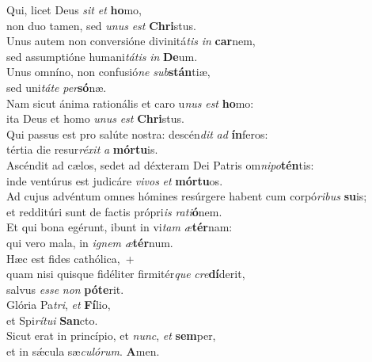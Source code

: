 \evenverse Qui, licet Deus \textit{sit} \textit{et} \textbf{ho}mo,~\*\\
\evenverse non duo tamen, sed \textit{u}\textit{nus} \textit{est} \textbf{Chri}stus.\\
\oddverse Unus autem non conversióne divinitá\textit{tis} \textit{in} \textbf{car}nem,~\*\\
\oddverse sed assumptióne humani\textit{tá}\textit{tis} \textit{in} \textbf{De}um.\\
\evenverse Unus omníno, non confusió\textit{ne} \textit{sub}\textbf{stán}tiæ,~\*\\
\evenverse sed uni\textit{tá}\textit{te} \textit{per}\textbf{só}næ.\\
\oddverse Nam sicut ánima rationális et caro u\textit{nus} \textit{est} \textbf{ho}mo:~\*\\
\oddverse ita Deus et homo \textit{u}\textit{nus} \textit{est} \textbf{Chri}stus.\\
\evenverse Qui passus est pro salúte nostra: descén\textit{dit} \textit{ad} \textbf{ín}feros:~\*\\
\evenverse tértia die resur\textit{ré}\textit{xit} \textit{a} \textbf{mór}\textbf{tu}is.\\
\oddverse Ascéndit ad cælos, sedet ad déxteram Dei Patris om\textit{ni}\textit{po}\textbf{tén}tis:~\*\\
\oddverse inde ventúrus est judicáre \textit{vi}\textit{vos} \textit{et} \textbf{mór}\textbf{tu}os.\\
\evenverse Ad cujus advéntum omnes hómines resúrgere habent cum corpó\textit{ri}\textit{bus} \textbf{su}is;~\*\\
\evenverse et redditúri sunt de factis própri\textit{is} \textit{ra}\textit{ti}\textbf{ó}nem.\\
\oddverse Et qui bona egérunt, ibunt in vi\textit{tam} \textit{æ}\textbf{tér}nam:~\*\\
\oddverse qui vero mala, in \textit{i}\textit{gnem} \textit{æ}\textbf{tér}num.\\
\evenverse Hæc est fides cathólica,~+\\
\evenverse  quam nisi quisque fidéliter firmitér\textit{que} \textit{cre}\textbf{dí}derit,~\*\\
\evenverse salvus \textit{es}\textit{se} \textit{non} \textbf{pó}\textbf{te}rit.\\
\oddverse Glória Pa\textit{tri}, \textit{et} \textbf{Fí}lio,~\*\\
\oddverse et Spi\textit{rí}\textit{tu}\textit{i} \textbf{San}cto.\\
\evenverse Sicut erat in princípio, et \textit{nunc}, \textit{et} \textbf{sem}per,~\*\\
\evenverse et in sǽcula sæ\textit{cu}\textit{ló}\textit{rum}. \textbf{A}men.\\
